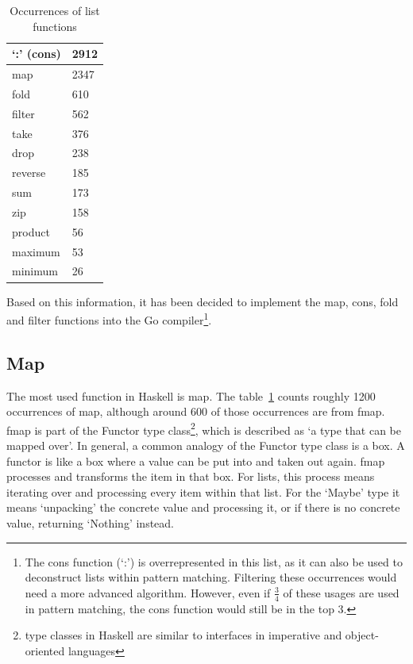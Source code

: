 \begin{table}[htb]
\centering
\begin{tabular}{ll}
\toprule
`:' (cons) & 2912 \\
\midrule
map & 2347 \\
\midrule
fold & 610 \\
\midrule
filter & 562 \\
\midrule
take & 376 \\
\midrule
drop & 238 \\
\midrule
reverse & 185 \\
\midrule
sum & 173 \\
\midrule
zip & 158 \\
\midrule
product & 56 \\
\midrule
maximum & 53 \\
\midrule
minimum & 26 \\
\end{tabular}
\caption[Occurrences of list functions]{Occurrences of list functions\footnotemark}
\label{tab:occurrences-list-funcs}
\end{table}


Based on this information, it has been decided to implement the map, cons, fold
and filter functions into the Go compiler\footnote{The cons function (`:') is overrepresented in this list,
    as it can also be used to deconstruct lists within pattern matching. Filtering
    these occurrences would need a more advanced algorithm. However, even if $\tfrac{3}{4}$
    of these usages are used in pattern matching, the cons function would still be
    in the top 3.
}.

\subsection{Map}

The most used function in Haskell is map. The table~\ref{tab:occurrences-list-funcs}
counts roughly 1200 occurrences of map, although around 600 of those occurrences are from
fmap. fmap is part of the Functor type class\footnote{type classes
    in Haskell are similar to interfaces in imperative and object-oriented
languages}, which is described as `a type that can be mapped over'\autocite{functor-wiki}.
In general, a common analogy of the Functor type class is a box. A functor is like a box
where a value can be put into and taken out again. fmap processes and transforms the item
in that box. For lists, this process means iterating over and processing every item within that list.
For the `Maybe' type it means `unpacking' the concrete value and processing it, or if there is
no concrete value, returning `Nothing' instead.

